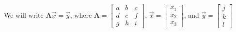 \documentclass[a4paper, 12pt]{article}
\begin{document}
                We will write $\mathbf{A}\vec{x} = \vec{y}$, where $\mathbf{A} = \begin{bmatrix}
                    a & b & c \\
                    d & e & f \\
                    g & h & i
                \end{bmatrix}$, $\vec{x} = \begin{bmatrix}
                    x_1 \\
                    x_2 \\
                    x_3
                \end{bmatrix}$, and $\vec{y} = \begin{bmatrix}
                    j \\
                    k \\
                    l
                \end{bmatrix}$
                \medskip
\end{document}
